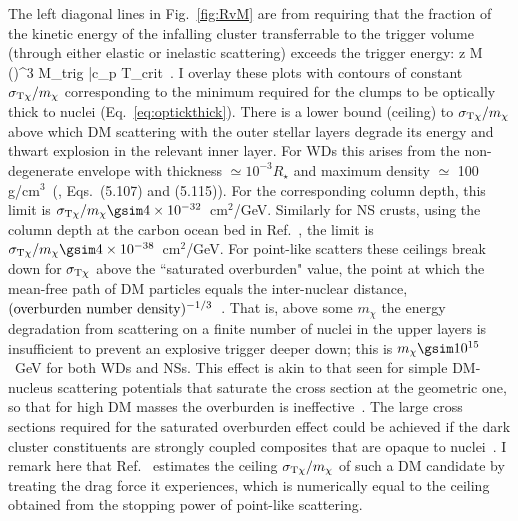 \documentclass[
    twocolumn,
	prd,
        amssymb,
	preprintnumbers,
	secnumarabic,
	nofootinbib,
	superscriptaddress]{revtex4-1}
\begin{document}
The left diagonal lines in Fig.~\ref{fig:RvM} are from requiring that the fraction of the kinetic energy of the infalling cluster transferrable to the trigger volume (through either elastic or inelastic scattering) exceeds the trigger energy:
\beq
z M \bigg(\bigg)^3 \geq M_{\rm trig} \bar c_p T_{\rm crit}~.
\label{eq:RvMleftdiag}
\eeq
I overlay these plots with contours of constant $\sigma_{\rm T\chi}/m_\chi$ corresponding to the minimum required for the clumps to be optically thick to nuclei (Eq.~\eqref{eq:optickthick}).
There is a lower bound (ceiling) to $\sigma_{\rm T\chi}/m_\chi$ above which DM scattering with the outer stellar layers degrade its energy and thwart explosion in the relevant inner layer.
For WDs this arises from the non-degenerate envelope with thickness $\simeq 10^{-3} R_\star$ and maximum density $\simeq$ 100 g/cm$^3$~(\cite{paddytheoryastroII}, Eqs.~(5.107) and (5.115)).
For the corresponding column depth, this limit is $\sigma_{\rm T\chi}/m_\chi \gsim 4 \times 10^{-32}$~cm$^2$/GeV. 
Similarly for NS crusts, using the column depth at the carbon ocean bed in Ref.~\cite{supburst:Cflashes:Cumming:2001wg}, the limit is  $\sigma_{\rm T\chi}/m_\chi \gsim 4 \times 10^{-38}$~cm$^2$/GeV.
For point-like scatters these ceilings break down for $\sigma_{\rm T\chi}$ above the ``saturated overburden" value, the point at which the mean-free path of DM particles equals the inter-nuclear distance, $({\rm overburden \ number \ density})^{-1/3}$~\cite{Bramante:2018qbc}.
That is, above some $m_\chi$ the energy degradation from scattering on a finite number of nuclei in the upper layers is insufficient to prevent an explosive trigger deeper down; this is $m_\chi \gsim 10^{15}$~GeV for both WDs and NSs.
This effect is akin to that seen for simple DM-nucleus scattering potentials that saturate the cross section at the geometric one, so that for high DM masses the overburden is ineffective~\cite{GoodmanWitten:1984dc,DigmanBarn:2019wdm}.
The large cross sections required for the saturated overburden effect could be achieved if the dark cluster constituents are strongly coupled composites that are opaque to nuclei~\cite{DigmanBarn:2019wdm,Cappiello:2020lbk,Starkman:1990nj,Jacobs:2014yca,SinghSidhu:2018oqs,xmaslights:DEAPCollaboration:2021raj,macroradarDhakal:2022rwn}.
I remark here that Ref.~\cite{MACROSidhu2020} estimates the ceiling $\sigma_{\rm T\chi}/m_\chi$ of such a DM candidate by treating the drag force it experiences, which is numerically equal to the ceiling obtained from the stopping power of point-like scattering.
\end{document}
